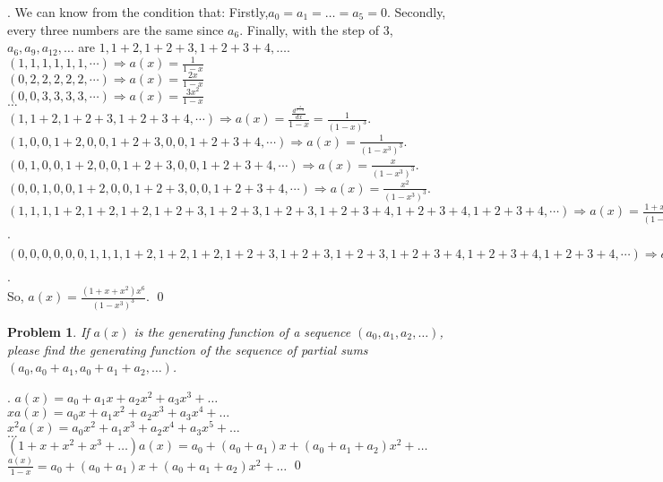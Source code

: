 \documentclass[12pt]{article}
\newtheorem{hw}{Problem}
\newenvironment{sol}
  {\par\vspace{3mm}\noindent{\it Solution}.}
  {\qed}
\begin{document}
\begin{sol}
    We can know from the condition that: Firstly,$a_0=a_1=\ldots=a_5=0$. Secondly, every three numbers are the same since $a_6$. Finally, with the step of $3$, $a_6,a_9,a_{12},\ldots$ are $1,1+2,1+2+3,1+2+3+4,\ldots$.
    \\$(1,1,1,1,1,1,\cdots)\Rightarrow a(x)=\frac{1}{1-x} $
    \\$(0,2,2,2,2,2,\cdots)\Rightarrow a(x)=\frac{2x}{1-x}$
    \\$(0,0,3,3,3,3,\cdots)\Rightarrow a(x)=\frac{3x^2}{1-x} $
    \\$\ldots$
    \\$(1,1+2,1+2+3,1+2+3+4,\cdots)\Rightarrow a(x)=\frac{\frac{d^\frac{x}{1-x}}{d x} }{1-x} =\frac{1}{(1-x)^3}$.
    \\$(1,0,0,1+2,0,0,1+2+3,0,0,1+2+3+4,\cdots)\Rightarrow a(x)=\frac{1}{(1-x^3)^3}$.
    \\$(0,1,0,0,1+2,0,0,1+2+3,0,0,1+2+3+4,\cdots)\Rightarrow a(x)=\frac{x}{(1-x^3)^3}$.
    \\$(0,0,1,0,0,1+2,0,0,1+2+3,0,0,1+2+3+4,\cdots)\Rightarrow a(x)=\frac{x^2}{(1-x^3)^3}$.
    \\$(1,1,1,1+2,1+2,1+2,1+2+3,1+2+3,1+2+3,1+2+3+4,1+2+3+4,1+2+3+4,\cdots)\Rightarrow a(x)=\frac{1+x+x^2}{(1-x^3)^3}$.
    \\$(0,0,0,0,0,0,1,1,1,1+2,1+2,1+2,1+2+3,1+2+3,1+2+3,1+2+3+4,1+2+3+4,1+2+3+4,\cdots)\Rightarrow a(x)=\frac{(1+x+x^2)x^6}{(1-x^3)^3}$.
    \\So, $a(x)=\frac{(1+x+x^2)x^6}{(1-x^3)^3}$.
\end{sol}



\begin{hw}
If $a(x)$ is the generating function of a sequence $(a_0, a_1, a_2, \ldots)$, please find the generating function of the sequence of partial sums $(a_0, a_0+a_1, a_0+a_1+a_2, \ldots)$.
\end{hw}

\begin{sol}
    $a(x)=a_0+a_1x+a_2x^2+a_3x^3+\ldots$
    \\$xa(x)=a_0x+a_1x^2+a_2x^3+a_3x^4+\ldots$
    \\$x^2a(x)=a_0x^2+a_1x^3+a_2x^4+a_3x^5+\ldots$
    \\$\ldots$
    \\$(1+x+x^2+x^3+\ldots)a(x)=a_0+(a_0+a_1)x+(a_0+a_1+a_2)x^2+\ldots$
    \\$\frac{a(x)}{1-x}=a_0+(a_0+a_1)x+(a_0+a_1+a_2)x^2+\ldots$
\end{sol}
\end{document}
